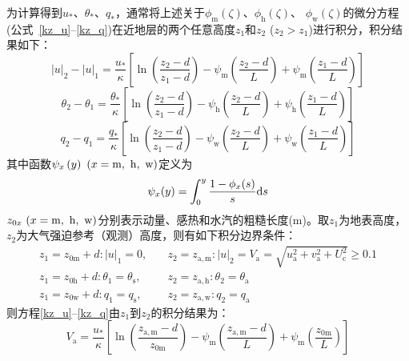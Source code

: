 为计算得到$u_\ast$、$\theta_\ast$、$q_\ast$，通常将上述关于$\phi_{\mathrm m}\left(\zeta\right)$、$\phi_{\mathrm h}\left(\zeta\right)$、
$\phi_{\mathrm w}(\zeta)$的微分方程(公式~\eqref{kz_u}--\eqref{kz_q})在近地层的两个任意高度$z_1$和$z_2$ ($z_2>z_1$)进行积分，积分结果如下：
\begin{equation}
  |u|_{2}-|u|_{1}=\frac{u_{*}}{\kappa}\left[\ln \left(\frac{z_{2}-d}{z_{1}-d}\right)-\psi_{\mathrm{m}}\left(\frac{z_{2}-d}{L}\right)+\psi_{\mathrm{m}}\left(\frac{z_{1}-d}{L}\right)\right]
\end{equation}
%
\begin{equation}
  \theta_{2}-\theta_{1}=\frac{\theta_{*}}{\kappa}\left[\ln \left(\frac{z_{2}-d}{z_{1}-d}\right)-\psi_{\mathrm{h}}\left(\frac{z_{2}-d}{L}\right)+\psi_{\mathrm{h}}\left(\frac{z_{1}-d}{L}\right)\right]
\end{equation}
%
\begin{equation}
  q_{2}-q_{1}=\frac{q_{*}}{\kappa}\left[\ln \left(\frac{z_{2}-d}{z_{1}-d}\right)-\psi_{\mathrm{w}}\left(\frac{z_{2}-d}{L}\right)+\psi_{\mathrm{w}}\left(\frac{z_{1}-d}{L}\right)\right]
\end{equation}
其中函数$\psi_x\left(y\right)\ (x=\rm m,\ h,\ w)$定义为
\begin{equation}
  \psi_{x}(y)=\int_{\mathrm{0}}^{y} \frac{1-\phi_{x}(s)}{s} {\rm d} s
\end{equation}
$z_{0x}\ (x={\rm m,\ h,\ w})$分别表示动量、感热和水汽的粗糙长度(m)。取$z_1$为地表高度，$z_2$为大气强迫参考（观测）高度，则有如下积分边界条件：
\begin{equation}\label{VaIni}
  \begin{array}{ll}z_{1}=z_{\mathrm{0 m}}+d:|u|_{1}=0, \quad & z_{2}=z_{\mathrm{a, m}}: |u|_{2}=V_{\mathrm{a}}=\sqrt{u_{\mathrm{a}}^{2}+v_{\mathrm{a}}^{2}+U_{\mathrm{c}}^{2}} \geqslant 0.1 \\
    z_{1}=z_{\mathrm{0 h}}+d: \theta_{1}=\theta_{\mathrm{s}}, & z_{2}=z_{\mathrm{a, h}}: \theta_{2}=\theta_{\mathrm{a}} \\
  z_{1}=z_{\mathrm{0 w}}+d: q_{1}=q_{\mathrm{s}}, & z_{2}=z_{\mathrm{a, w}}: q_{2}=q_{\mathrm{a}}\end{array}
\end{equation}
则方程\eqref{kz_u}--\eqref{kz_q}由$z_1$到$z_2$的积分结果为：
\begin{equation}\label{Va}
  V_{\mathrm{a}}=\frac{u_{*}}{\kappa}\left[\ln \left(\frac{z_{\mathrm{a, m}}-d}{z_{\mathrm{0 m}}}\right)-\psi_{\mathrm{m}}\left(\frac{z_{\mathrm{a, m}}-d}{L}\right)+\psi_{\mathrm{m}}\left(\frac{z_{\mathrm{0 m}}}{L}\right)\right]
\end{equation}
